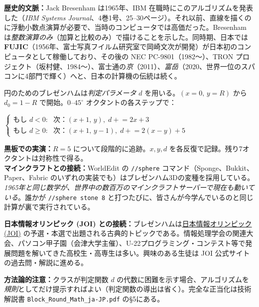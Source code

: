 \documentclass[12pt,a4paper]{scrartcl}
\newcommand{\acc}[1]{\textcolor{accent}{\textbf{#1}}}
\newcommand{\cmd}[1]{\textcolor{earth}{\texttt{\small #1}}}
\newcommand{\tempo}[1]{\textnormal{\footnotesize\color{bg!90!white}\textsf{#1}}}
\begin{document}
\begin{katsudou}[2.3 --- ブレゼンハム・アルゴリズム \quad\tempo{15分}]\label{at:23}
\textbf{歴史的文脈：}Jack Bresenham は1965年、IBM 在職時にこのアルゴリズムを発表した（\emph{IBM Systems Journal}、4巻1号、25--30ページ）。それ以前、直線を描くのに浮動小数点演算が必要で、当時のコンピュータでは高価だった。Bresenham は\emph{整数演算のみ}（加算と比較のみ）で描けることを示した。同時期、日本では\acc{FUJIC}（1956年、富士写真フイルム研究室で岡崎文次が開発）が日本初のコンピュータとして稼働しており、その後の NEC PC-9801（1982〜）、TRON プロジェクト（坂村健、1984〜）、富士通の\emph{京}（2011）、\emph{富岳}（2020、世界一位のスパコンに4部門で輝く）へと、日本の計算機の伝統は続く。

円のためのブレゼンハムは\emph{判定パラメータ} $d$ を用いる。$(x{=}0,\, y{=}R)$ から $d_0 = 1 - R$ で開始。$0$--$45^\circ$ オクタントの各ステップで：

\begin{shiki}
\centering
$\begin{cases}
\text{もし } d < 0\text{:} & \text{次：} (x{+}1,\, y),\; d \mathrel{+}= 2x+3 \\
\text{もし } d \geq 0\text{:} & \text{次：} (x{+}1,\, y{-}1),\; d \mathrel{+}= 2(x-y)+5
\end{cases}$
\end{shiki}

\textbf{黒板での実演：}$R = 5$ について段階的に追跡。$x, y, d$ を各反復で記録。残り7オクタントは対称性で得る。 \\

\textbf{マインクラフトとの接続：}WorldEdit の \cmd{//sphere} コマンド（Sponge、Bukkit、Paper、Fabric のいずれの実装でも）はブレゼンハム3Dの変種を採用している。\emph{1965年と同じ数学が、世界中の数百万のマインクラフトサーバーで現在も動いている}。誰かが \texttt{//sphere stone 8} と打つたびに、皆さんが今学んでいるのと同じ計算が裏で実行されている。

\textbf{日本情報オリンピック (JOI) との接続：}ブレゼンハムは\href{https://www.ioi-jp.org/}{日本情報オリンピック (JOI)} の予選・本選で出題される古典的トピックである。情報処理学会の関連大会、パソコン甲子園（会津大学主催）、U-22プログラミング・コンテスト等で発展問題を解いてきた高校生・高専生は多い。興味のある生徒は JOI 公式サイトの過去問・解説に進める。

\textbf{方法論的注意：}クラスが判定関数 $d$ の代数に困難を示す場合、アルゴリズムを\emph{規則}としてだけ提示すればよい（判定関数の導出は省く）。完全な正当化は技術解説書 \texttt{Block\_Round\_Math\_ja-JP.pdf} の§5にある。
\end{katsudou}
\end{document}
